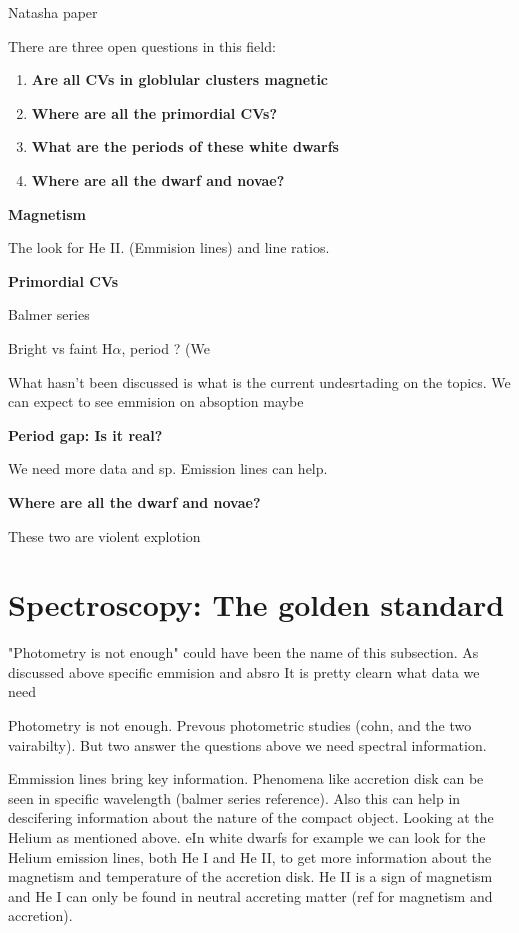 Natasha paper


There are three open questions in this field:

\begin{enumerate}
        \item \textbf{Are all CVs in globlular clusters magnetic}
        \item \textbf{Where are all the primordial CVs?}
        \item \textbf{What are the periods of these white dwarfs}
        \item \textbf{Where are all the dwarf and novae?}
\end{enumerate}

\textbf{Magnetism}

The look for He II. (Emmision lines) and line ratios. 

\textbf{Primordial CVs}

Balmer series

Bright vs faint H$\alpha$, period ? (We

What hasn't been discussed is what is the current undesrtading on the topics. 
We can expect to see emmision on absoption maybe


\textbf{Period gap: Is it real?}

We need more data and sp. Emission lines can help. 


\textbf{Where are all the dwarf and novae?}

These two are violent explotion




\section{Spectroscopy: The golden standard}\label{sec:spec}

"Photometry is not enough" could have been the name of this subsection. As discussed above specific emmision and absro 
It is pretty clearn what data we need


Photometry is not enough. Prevous photometric studies (cohn, and the two vairabilty). But two answer the questions above we need spectral information. 

Emmission lines bring key information. Phenomena like accretion disk can be seen in specific wavelength (balmer series reference). Also this can help in descifering information about the nature of the compact object. Looking at the Helium as mentioned above. eIn white dwarfs for example we can look for the Helium emission lines, both He I and He II, to get more information about the magnetism and temperature of the accretion disk. He II is a sign of magnetism and He I can only be found in neutral accreting matter (ref for magnetism and accretion).  

